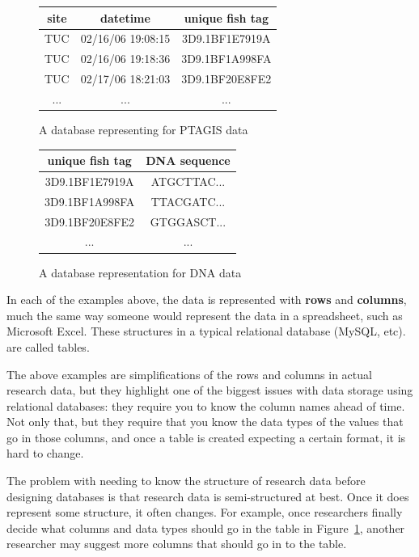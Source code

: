 \begin{figure}[h]
	\begin{center}
	\begin{tabular}{ | c | c | c | }
		\hline
		site	&	datetime		&	unique fish tag	\\
		\hline
		TUC	&	02/16/06 19:08:15 	&	3D9.1BF1E7919A 	\\
		TUC	&	02/16/06 19:18:36 	&	3D9.1BF1A998FA 	\\
		TUC	&	02/17/06 18:21:03 	&	3D9.1BF20E8FE2	\\
		...	&	...			&	...		\\
		\hline
	\end{tabular}
	\caption{A database representing for PTAGIS data} 
	\label{ptagis_ex1}
	\end{center}
\end{figure}

\begin{figure}[h]
	\begin{center}
	\begin{tabular}{ | c | c | }
		\hline
		unique fish tag	&	DNA sequence	\\
		\hline
		3D9.1BF1E7919A 	&	ATGCTTAC...	\\
		3D9.1BF1A998FA 	&	TTACGATC...	\\
		3D9.1BF20E8FE2	&	GTGGASCT...	\\
		...		&	...		\\
		\hline
	\end{tabular}
	\caption{A database representation for DNA data} 
	\label{dna_ex1}
	\end{center}
\end{figure}

In each of the examples above, the data is represented with \textbf{rows} and
\textbf{columns}, much the same way someone would represent the data in a
spreadsheet, such as Microsoft Excel. These structures in a typical
relational database (MySQL, etc).  are called tables.

The above examples are simplifications of the rows and columns in actual research 
data, but they highlight one of the biggest issues with data storage using relational
databases: they require you to know the column names ahead of time. Not only that,
but they require that you know the data types of the values that go in those columns,
and once a table is created expecting a certain format, it is hard to change.

The problem with needing to know the structure of research data before designing
databases is that research data is semi-structured at best. Once it does
represent some structure, it often changes. For example, once researchers finally 
decide what columns and data types should go in the table in Figure~\ref{ptagis_ex1},
another researcher may suggest more columns that should go in to the table.

